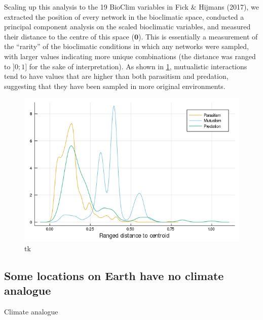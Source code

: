 Scaling up this analysis to the 19 BioClim variables in Fick \& Hijmans
(2017), we extracted the position of every network in the bioclimatic
space, conducted a principal component analysis on the scaled
bioclimatic variables, and measured their distance to the centre of this
space (\(\mathbf{0}\)). This is essentially a measurement of the
``rarity'' of the bioclimatic conditions in which any networks were
sampled, with larger values indicating more unique combinations (the
distance was ranged to \(]0;1]\) for the sake of interpretation). As
shown in \cref{fig:ecc}, mutualistic interactions tend to
have values that are higher than both parasitism and predation,
suggesting that they have been sampled in more original environments.

\begin{figure}
\centering
\includegraphics{figures/figure_05_b.png}
\caption{tk\label{fig:ecc}}
\end{figure}

\hypertarget{some-locations-on-earth-have-no-climate-analogue}{%
\subsection{Some locations on Earth have no climate
analogue}\label{some-locations-on-earth-have-no-climate-analogue}}

Climate analogue

